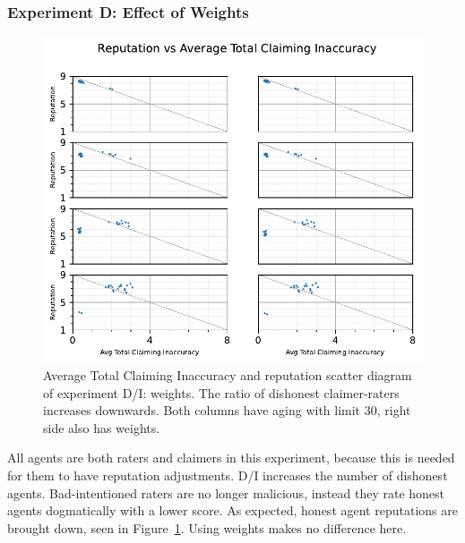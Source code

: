 \documentclass[%
    ]{\PathToTumTemplate/thesis/tum_thesis}
\begin{document}
\subsubsection{Experiment D: Effect of Weights}

\begin{figure}[tbp]
  \begin{center}
        \includegraphics[width=0.75\linewidth]	{../results/d/AvgTotClaimInaccuracyAndReputationScatter_joined.pdf}
    \caption{
    Average Total Claiming Inaccuracy and reputation scatter diagram of experiment D/I: weights.
    The ratio of dishonest claimer-raters increases downwards.
    Both columns have aging with limit 30, right side also has weights.
    }
    \label{fig:res_d_scatter}
  \end{center}
\end{figure}

All agents are both raters and claimers in this experiment, because this is needed for them to have reputation adjustments.
D/I increases the number of dishonest agents.
Bad-intentioned raters are no longer malicious, instead they rate honest agents dogmatically with a lower score.
As expected, honest agent reputations are brought down, seen in Figure~\ref{fig:res_d_scatter}.
Using weights makes no difference here.
\end{document}
